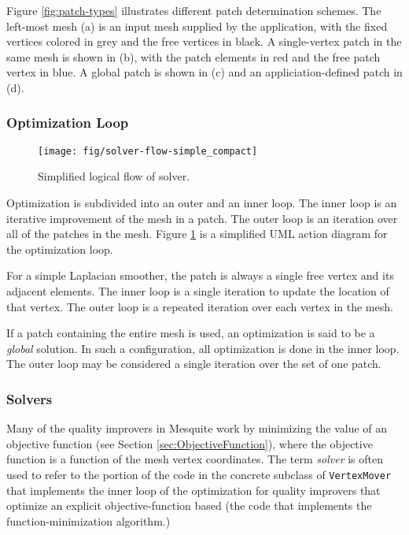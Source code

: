 \documentclass{article}
\begin{document}
Figure \ref{fig:patch-types} illustrates different patch determination schemes.  The left-most mesh (a) is an input mesh supplied by the application, with the fixed vertices colored in grey and the free vertices in black. A single-vertex patch in the same mesh is shown in (b), with the patch elements in red and the free patch vertex in blue.   A global patch is shown in (c) and an appliciation-defined patch in (d).

\subsubsection{Optimization Loop}

\begin{figure}[htb]
\begin{center}
\texttt{[image: fig/solver-flow-simple\_compact]}
\caption{Simplified logical flow of solver.\label{fig:solver-flow}}
\end{center}
\end{figure}

Optimization is subdivided into an outer and an inner loop.  The inner loop is an iterative improvement of the mesh in a patch.  The outer loop is an iteration over all of the patches in the mesh.  Figure \ref{fig:solver-flow} is a simplified UML action diagram for the optimization loop.  

For a simple Laplacian smoother, the patch is always a single free vertex and its adjacent elements.  The inner loop is a single iteration to update the location of that vertex.  The outer loop is a repeated iteration over each vertex in the mesh.

If a patch containing the entire mesh is used, an optimization is said to be a \emph{global} solution.  In such a configuration, all optimization is done in the inner loop.  The outer loop may be considered a single iteration over the set of one patch.

\subsubsection{Solvers}

Many of the quality improvers in Mesquite work by minimizing the value of an objective function (see Section \ref{sec:ObjectiveFunction}), where the objective function is a function of the mesh vertex coordinates.   The term \emph{solver} is often used to refer to the portion of the code in the concrete subclass of \texttt{VertexMover} that implements the inner loop of the optimization for quality improvers that optimize an explicit objective-function based (the code that implements the function-minimization algorithm.)  
\end{document}
